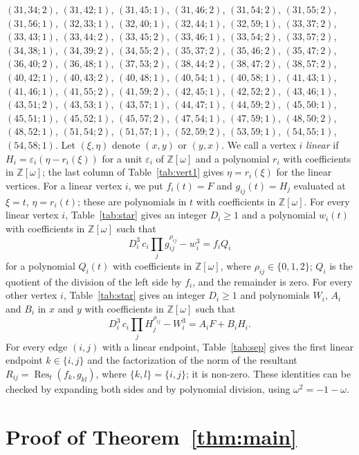 \documentclass[11pt]{article}
\newcommand{\Z}{\mathbb{Z}}
\begin{document}
$(31,34;2)$, $(31,42;1)$, $(31,45;1)$, $(31,46;2)$, $(31,54;2)$, $(31,55;2)$, $(31,56;1)$, $(32,33;1)$, $(32,40;1)$, $(32,44;1)$, $(32,59;1)$, $(33,37;2)$, $(33,43;1)$, $(33,44;2)$, $(33,45;2)$, $(33,46;1)$, $(33,54;2)$, $(33,57;2)$, $(34,38;1)$, $(34,39;2)$, $(34,55;2)$, $(35,37;2)$, $(35,46;2)$, $(35,47;2)$, $(36,40;2)$, $(36,48;1)$, $(37,53;2)$, $(38,44;2)$, $(38,47;2)$, $(38,57;2)$, $(40,42;1)$, $(40,43;2)$, $(40,48;1)$, $(40,54;1)$, $(40,58;1)$, $(41,43;1)$, $(41,46;1)$, $(41,55;2)$, $(41,59;2)$, $(42,45;1)$, $(42,52;2)$, $(43,46;1)$, $(43,51;2)$, $(43,53;1)$, $(43,57;1)$, $(44,47;1)$, $(44,59;2)$, $(45,50;1)$, $(45,51;1)$, $(45,52;1)$, $(45,57;2)$, $(47,54;1)$, $(47,59;1)$, $(48,50;2)$, $(48,52;1)$, $(51,54;2)$, $(51,57;1)$, $(52,59;2)$, $(53,59;1)$, $(54,55;1)$, $(54,58;1)$.
Let $(\xi,\eta)$ denote $(x,y)$ or $(y,x)$. We call a vertex $i$ \emph{linear} if $H_i=\varepsilon_i(\eta-r_i(\xi))$ for a unit $\varepsilon_i$ of $\Z[\omega]$ and a polynomial $r_i$ with coefficients in $\Z[\omega]$; the last column of Table~\ref{tab:vert1} gives $\eta=r_i(\xi)$ for the linear vertices. For a linear vertex $i$, we put $f_i(t)=F$ and $g_{ij}(t)=H_j$ evaluated at $\xi=t$, $\eta=r_i(t)$; these are polynomials in $t$ with coefficients in $\Z[\omega]$.
For every linear vertex $i$, Table~\ref{tab:star} gives an integer $D_i\geq1$ and a polynomial $w_i(t)$ with coefficients in $\Z[\omega]$ such that
\begin{equation}\label{eq:starlin}
D_i^3\,c_i\prod_jg_{ij}^{\rho_{ij}}-w_i^3=f_iQ_i
\end{equation}
for a polynomial $Q_i(t)$ with coefficients in $\Z[\omega]$, where $\rho_{ij}\in\{0,1,2\}$; $Q_i$ is the quotient of the division of the left side by $f_i$, and the remainder is zero.
For every other vertex $i$, Table~\ref{tab:star} gives an integer $D_i\geq1$ and polynomials $W_i$, $A_i$ and $B_i$ in $x$ and $y$ with coefficients in $\Z[\omega]$ such that
\begin{equation}\label{eq:star}
D_i^3\,c_i\prod_jH_j^{\rho_{ij}}-W_i^3=A_iF+B_iH_i.
\end{equation}
For every edge $(i,j)$ with a linear endpoint, Table~\ref{tab:sep} gives the first linear endpoint $k\in\{i,j\}$ and the factorization of the norm of the resultant $R_{ij}=\operatorname{Res}_t(f_k,g_{kl})$, where $\{k,l\}=\{i,j\}$; it is non-zero.
These identities can be checked by expanding both sides and by polynomial division, using $\omega^2=-1-\omega$.

\section{Proof of Theorem~\ref{thm:main}}
\end{document}
